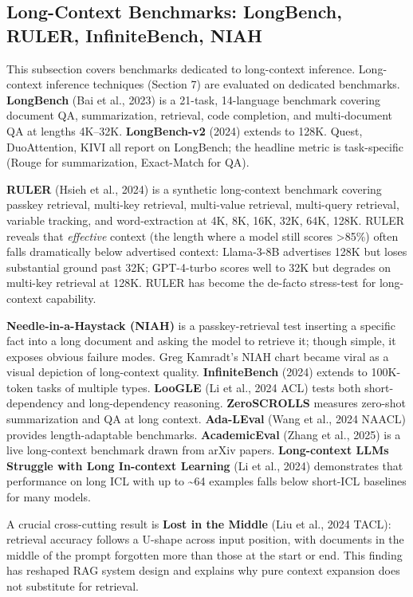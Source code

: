 \subsection{Long-Context Benchmarks: LongBench, RULER, InfiniteBench, NIAH}\label{long-context-benchmarks-longbench-ruler-infinitebench-niah}

This subsection covers benchmarks dedicated to long-context inference. Long-context inference techniques (Section 7) are evaluated on dedicated benchmarks. \textbf{LongBench} (Bai et al., 2023) is a 21-task, 14-language benchmark covering document QA, summarization, retrieval, code completion, and multi-document QA at lengths 4K--32K. \textbf{LongBench-v2} (2024) extends to 128K. Quest, DuoAttention, KIVI all report on LongBench; the headline metric is task-specific (Rouge for summarization, Exact-Match for QA).

\textbf{RULER} (Hsieh et al., 2024) is a synthetic long-context benchmark covering passkey retrieval, multi-key retrieval, multi-value retrieval, multi-query retrieval, variable tracking, and word-extraction at 4K, 8K, 16K, 32K, 64K, 128K. RULER reveals that \emph{effective} context (the length where a model still scores \textgreater85\%) often falls dramatically below advertised context: Llama-3-8B advertises 128K but loses substantial ground past 32K; GPT-4-turbo scores well to 32K but degrades on multi-key retrieval at 128K. RULER has become the de-facto stress-test for long-context capability.

\textbf{Needle-in-a-Haystack (NIAH)} is a passkey-retrieval test inserting a specific fact into a long document and asking the model to retrieve it; though simple, it exposes obvious failure modes. Greg Kamradt's NIAH chart became viral as a visual depiction of long-context quality. \textbf{InfiniteBench} (2024) extends to 100K-token tasks of multiple types. \textbf{LooGLE} (Li et al., 2024 ACL) tests both short-dependency and long-dependency reasoning. \textbf{ZeroSCROLLS} measures zero-shot summarization and QA at long context. \textbf{Ada-LEval} (Wang et al., 2024 NAACL) provides length-adaptable benchmarks. \textbf{AcademicEval} (Zhang et al., 2025) is a live long-context benchmark drawn from arXiv papers. \textbf{Long-context LLMs Struggle with Long In-context Learning} (Li et al., 2024) demonstrates that performance on long ICL with up to \textasciitilde64 examples falls below short-ICL baselines for many models.

A crucial cross-cutting result is \textbf{Lost in the Middle} (Liu et al., 2024 TACL): retrieval accuracy follows a U-shape across input position, with documents in the middle of the prompt forgotten more than those at the start or end. This finding has reshaped RAG system design and explains why pure context expansion does not substitute for retrieval.

